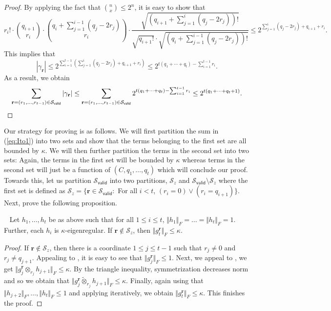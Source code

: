 \documentclass{toc}
\begin{document}
\begin{proof} By applying the fact that $\binom{n}{x} \le 2^n$, it is easy to show that 
\[
r_i! \cdot \binom{q_{i+1}}{r_i} \cdot \binom{q_i+ \sum_{j=1}^{i-1} (q_j - 2 r_j) }{r_i} \cdot \frac{\sqrt{(q_{i+1}+ \sum_{j=1}^{i} (q_j - 2 r_j) )!}}{\sqrt{q_{i+1}!} \cdot \sqrt{(q_i+ \sum_{j=1}^{i-1} (q_j - 2 r_j))!}} \le 2^{\sum_{j=1}^i (q_j - 2 r_j) + q_{i+1} + r_i }. 
\] 
This implies that 
\[
 |\gamma_{\mathbf{r}}|  \le 2^{\sum_{i=1}^{t-1} (\sum_{j=1}^i (q_j - 2 r_j) + q_{i+1} + r_i ) } \le 2^{t(q_1 +\cdots + q_t) - \sum_{i=1}^{t-1} r_{i}}. 
\]
As a result, we obtain 
\[
\sum_{\mathbf{r} =(r_1, \ldots, r_{t-1}) \in \mathcal{S}_{\mathsf{valid}}} |\gamma_{\mathbf{r}}| \le \sum_{\mathbf{r} =(r_1, \ldots, r_{t-1}) \in \mathcal{S}_{\mathsf{valid}}}2^{t(q_1 +\cdots + q_t) - \sum_{i=1}^{t-1} r_{i}} \le 2^{t(q_1 + \cdots + q_t +1)}. \qedhere
\]
\end{proof}
Our strategy for proving  is as follows. We will first partition the sum in (\ref{eq:Ito1}) into two sets and show that the terms belonging to the first set are all bounded by $\kappa$. We will then further partition the terms in the  second set into two sets: Again, the terms in the first set will be bounded by $\kappa$ whereas terms in the second set will just be a function of $(C, q_1, \ldots, q_t)$ which will conclude our proof. Towards this, let us partition $\mathcal{S}_{\mathsf{valid}}$ into two partitions, $\mathcal{S}_z$ and $\mathcal{S}_{\mathsf{valid}} \setminus \mathcal{S}_z$ where the first set is defined as 
 $\mathcal{S}_z = \{\mathbf{r} \in \mathcal{S}_{\mathsf{valid}}:$ For all $i <t$, $(r_i=0) \vee (r_i = q_{i+1}) \}$.
Next, prove the following proposition. 
\begin{proposition}~\label{prop:approx-error2}
Let $h_1, \ldots, h_t$ be as above such that for all $1 \le i \le t$,  $ \Vert h_1 \Vert_F = \ldots = \Vert h_t \Vert_F=1$. Further, each $h_i$ is $\kappa$-eigenregular. If $\mathbf{r} \not \in \mathcal{S}_z$, then $\Vert g^{\mathbf{r}}_{t} \Vert_F \le \kappa$. 
\end{proposition}
\begin{proof}
If $\mathbf{r} \not \in \mathcal{S}_z$, then there is a coordinate $1 \le j \le t-1$ such that $r_j \neq  0$ and $r_j \neq  q_{j+1}$. Appealing to , it is easy to see that  $\Vert g^{\mathbf{r}}_{j} \Vert_F \le 1$. Next, we appeal to , we get $\Vert g^{\mathbf{r}}_{j} {\otimes}_{r_{j}} h_{j+1} \Vert_F \le \kappa$. By the triangle inequality, symmetrization decreases norm and so we obtain that $\Vert g^{\mathbf{r}}_{j} \widetilde{\otimes}_{r_{j}} h_{j+1} \Vert_F \le \kappa$. Finally, again using that $\Vert h_{j+2} \Vert_F, \ldots, \Vert h_t \Vert_F \le 1$ and applying  iteratively, we obtain $\Vert g^{\mathbf{r}}_{t} \Vert_F \le \kappa$. This finishes the proof.
\end{proof}
\end{document}
